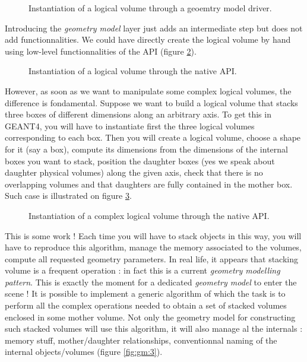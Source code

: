 \begin{figure}[h]
\begin{center}
\scalebox{0.75}{}
\end{center}
\caption{Instantiation of  a logical  volume through a  geoemtry model
  driver.}\label{fig:gm:0}
\end{figure}


\pn  Introducing   the  \emph{geometry  model}  layer   just  adds  an
intermediate step  but does not  add functionnalities.  We  could have
directly   create  the   logical  volume   by  hand   using  low-level
functionnalities of the API (figure \ref{fig:gm:1}).

\begin{figure}[h]
\begin{center}
\scalebox{0.75}{}
\end{center}
\caption{Instantiation of  a logical  volume through the native
API.}\label{fig:gm:1}
\end{figure}

However, as soon  as we want to manipulate some
complex logical  volumes, the  difference is fondamental.   Suppose we
want to  build a logical volume  that stacks three  boxes of different
dimensions along  an arbitrary axis. To  get this in  GEANT4, you will
have to  instantiate first the three logical  volumes corresponding to
each box. Then you will create a logical volume, choose a shape for it
(say  a  box), compute  its  dimensions  from  the dimensions  of  the
internal boxes you want to  stack, position the daughter boxes (yes we
speak about daughter  physical volumes) along the given  axis, check that there
is no overlapping volumes and that daughters are fully contained in the
mother box. Such case is illustrated on figure \ref{fig:gm:2}.

\begin{figure}[h]
\begin{center}
\scalebox{0.75}{}
\end{center}
\caption{Instantiation of  a complex logical  volume through the native
API.}\label{fig:gm:2}
\end{figure}

This is some work ! Each time you will  have to stack objects in this way, you
will have to reproduce this algorithm, manage the memory associated to
the volumes, compute all  requested geometry parameters. In real life,
it appears  that stacking  volume is a  frequent operation :  in fact
this is a current  \emph{geometry modelling pattern}.  This is exactly
the moment for a dedicated  \emph{geometry model} to enter the scene !
It is possible  to implement a generic algorithm of  which the task is
to  perform all  the  complex operations  needed  to obtain  a set  of
stacked  volumes enclosed in  some mother  volume.  Not  only the geometry
model for constructing such stacked volumes  
will use this algorithm, it  will also
manage al  the internals  : memory stuff,  mother/daughter relationships,
conventionnal naming of the internal objects/volumes (figure \ref{fig:gm:3}).

